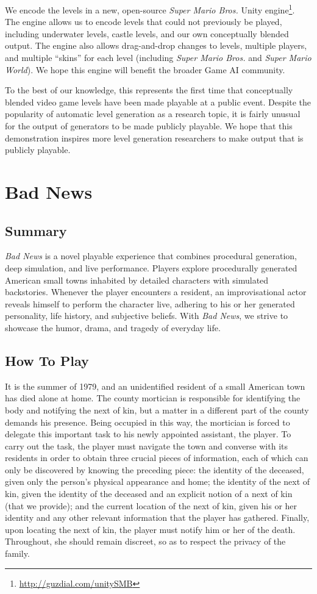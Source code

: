 \documentclass[letterpaper]{article}
\begin{document}
We encode the levels in a new, open-source \textit{Super Mario Bros.} Unity engine\footnote{\url{http://guzdial.com/unitySMB}}.
The engine allows us to encode levels that could not previously be played, including underwater levels, castle levels, and our own conceptually blended output.
The engine also allows drag-and-drop changes to levels, multiple players, and multiple ``skins'' for each level (including \textit{Super Mario Bros.} and \textit{Super Mario World}).
We hope this engine will benefit the broader Game AI community.

To the best of our knowledge, this represents the first time that conceptually blended video game levels have been made playable at a public event.
Despite the popularity of automatic level generation as a research topic, it is fairly unusual for the output of generators to be made publicly playable.
We hope that this demonstration inspires more level generation researchers to make output that is publicly playable.


\section{Bad News}
\subsection{Summary}
\textit{Bad News} is a novel playable experience that combines procedural generation, deep simulation, and live performance.
Players explore procedurally generated American small towns inhabited by detailed characters with simulated backstories.
Whenever the player encounters a resident, an improvisational actor reveals himself to perform the character live, adhering to his or her generated personality, life history, and subjective beliefs.
With \textit{Bad News}, we strive to showcase the humor, drama, and tragedy of everyday life.


\subsection{How To Play}

It is the summer of 1979, and an unidentified resident of a small American town has died alone at home.
The county mortician is responsible for identifying the body and notifying the next of kin, but a matter in a different part of the county demands his presence.
Being occupied in this way, the mortician is forced to delegate this important task to his newly appointed assistant, the player.
To carry out the task, the player must navigate the town and converse with its residents in order to obtain three crucial pieces of information, each of which can only be discovered by knowing the preceding piece: the identity of the deceased, given only the person's physical appearance and home; the identity of the next of kin, given the identity of the deceased and an explicit notion of a next of kin (that we provide); and the current location of the next of kin, given his or her identity and any other relevant information that the player has gathered.
Finally, upon locating the next of kin, the player must notify him or her of the death.
Throughout, she should remain discreet, so as to respect the privacy of the family.
\end{document}
